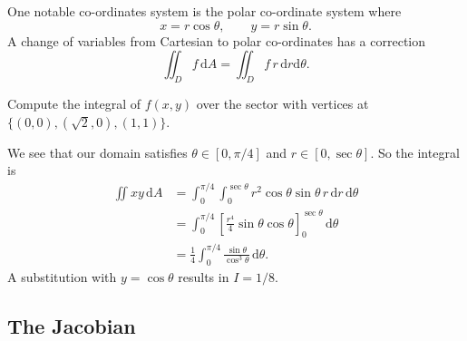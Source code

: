 \documentclass[letter-paper]{tufte-book}
\newenvironment{example}[1][Example]{\begin{trivlist}
\item[\hskip \labelsep {\bfseries #1}]}{\end{trivlist}}
\begin{document}
One notable co-ordinates system is the polar co-ordinate system where
\begin{equation*}
  x = r\cos\theta,\qquad y = r\sin\theta.
\end{equation*}
A change of variables from Cartesian to polar co-ordinates has a correction
\begin{equation*}
  \iint_D f\, \mathrm{d}A = \iint_D f\, r\, \mathrm{d}r\mathrm{d}\theta.
\end{equation*}
\begin{example}
  Compute the integral of $f(x,y)$ over the sector with vertices at $\{(0,0),
  (\sqrt{2},0), (1,1)\}$.
  
  We see that our domain satisfies $\theta \in [0, \pi/4]$ and $r \in [0,
  \sec\theta]$. So the integral is
  \begin{align*}
    \iint xy\, \mathrm{d}A &= \int_0^{\pi/4} \int_0^{\sec\theta} r^2\cos\theta\sin\theta\, r\, \mathrm{d}r\, \mathrm{d}\theta \\
      &= \int_0^{\pi/4} \left[\frac{r^4}{4} \sin\theta \cos\theta \right]_0^{\sec\theta}\, \mathrm{d}\theta \\
      &= \frac{1}{4} \int_0^{\pi/4} \frac{\sin\theta}{\cos^3\theta}\, \mathrm{d}\theta.
  \end{align*}
  A substitution with $y=\cos\theta$ results in $I = 1/8$.
\end{example}

\subsection{The Jacobian}
\end{document}

